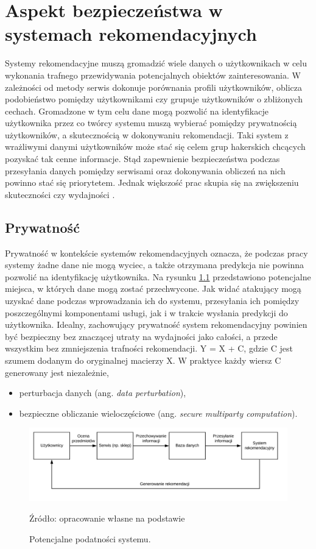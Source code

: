 
\chapter{Aspekt bezpieczeństwa w systemach rekomendacyjnych}
Systemy rekomendacyjne muszą gromadzić wiele danych o użytkownikach w celu wykonania trafnego przewidywania potencjalnych obiektów zainteresowania. W zależności od metody serwis dokonuje porównania  profili użytkowników, oblicza podobieństwo pomiędzy użytkownikami czy grupuje użytkowników o zbliżonych cechach. Gromadzone w tym celu dane mogą pozwolić na identyfikacje użytkownika przez co twórcy systemu muszą wybierać pomiędzy prywatnością użytkowników, a skutecznością w dokonywaniu rekomendacji. Taki system z wrażliwymi danymi użytkowników może stać się celem grup hakerskich chcących pozyskać tak cenne informacje. Stąd zapewnienie bezpieczeństwa podczas przesyłania danych pomiędzy serwisami oraz dokonywania obliczeń na nich powinno stać się priorytetem. Jednak większość prac skupia się na zwiększeniu skuteczności czy wydajności \cite{recent_developments}.

\section{Prywatność}
Prywatność w kontekście systemów rekomendacyjnych oznacza, że podczas pracy systemy żadne dane nie mogą wyciec, a także otrzymana predykcja nie powinna pozwolić na identyfikację użytkownika. Na rysunku \ref{fig:podatnosci} przedstawiono potencjalne miejsca, w których dane mogą zostać przechwycone. Jak widać atakujący mogą uzyskać dane podczas wprowadzania ich do systemu, przesyłania ich pomiędzy poszczególnymi komponentami usługi, jak i w trakcie wysłania predykcji do użytkownika. Idealny, zachowujący prywatność system rekomendacyjny powinien być bezpieczny bez znaczącej utraty na wydajności jako całości, a przede wszystkim bez zmniejszenia trafności rekomendacji. 
    Y = X + C, gdzie C jest szumem dodanym do oryginalnej macierzy X. W praktyce każdy wiersz C generowany jest niezależnie,
\begin{itemize}
    \item perturbacja danych (ang. \textit{data perturbation}),
    \item bezpieczne obliczanie wieloczęściowe (ang. \textit{secure multiparty computation}).
\end{itemize}

\begin{figure}
    \centering
    \includegraphics[scale=0.85]{images/podatnosci.png}
    \caption{Potencjalne podatności systemu.}    Źródło: opracowanie własne na podstawie \cite{}

    \label{fig:podatnosci}
\end{figure}
